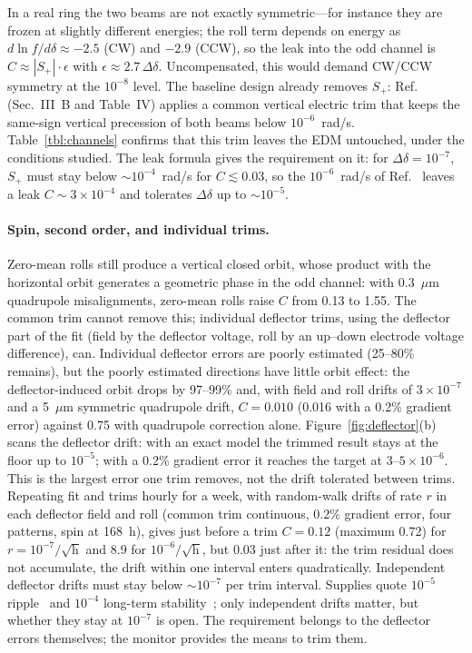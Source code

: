 \documentclass[aps,prab,reprint,superscriptaddress,nofootinbib]{revtex4-2}
\begin{document}
In a real ring the two beams are not exactly symmetric---for instance they are frozen at slightly different
energies; the roll term depends on energy as $d\ln f/d\delta\approx-2.5$ (CW) and $-2.9$ (CCW), so the leak into
the odd channel is $C\approx|S_+|\cdot\epsilon$ with $\epsilon\approx2.7\,\Delta\delta$. Uncompensated, this would
demand CW/CCW symmetry at the $10^{-8}$ level. The baseline design already removes $S_+$: Ref.~\cite{omarov}
(Sec.~III~B and Table~IV) applies a common vertical electric trim that keeps the same-sign vertical precession
of both beams below $10^{-6}$~rad/s. Table~\ref{tbl:channels} confirms that this trim leaves the EDM untouched,
under the conditions studied. The leak formula gives the requirement on it: for $\Delta\delta=10^{-7}$, $S_+$ must
stay below $\sim10^{-4}$~rad/s for $C\lesssim0.03$, so the $10^{-6}$~rad/s of Ref.~\cite{omarov} leaves a leak
$C\sim3\times10^{-4}$ and tolerates $\Delta\delta$ up to $\sim10^{-5}$.

\paragraph*{Spin, second order, and individual trims.} Zero-mean rolls still produce a vertical closed orbit,
whose product with the horizontal orbit generates a geometric phase in the odd channel: with 0.3~$\mu$m quadrupole
misalignments, zero-mean rolls raise $C$ from 0.13 to 1.55. The common trim cannot remove this; individual
deflector trims, using the deflector part of the fit (field by the deflector voltage, roll by an up--down
electrode voltage difference), can. Individual deflector errors are poorly estimated (25--80\% remains), but
the poorly estimated directions have little orbit effect: the deflector-induced orbit drops by 97--99\% and,
with field and roll drifts of $3\times10^{-7}$ and a 5~$\mu$m symmetric quadrupole drift, $C=0.010$ (0.016 with a
0.2\% gradient error) against 0.75 with quadrupole correction alone. \MatchedSentenceEN Figure~\ref{fig:deflector}(b)
scans the deflector drift: with an exact model the trimmed result stays at the floor up to $10^{-5}$; with a
0.2\% gradient error it reaches the target at $3$--$5\times10^{-6}$. This is the largest error one trim
removes, not the drift tolerated between trims. Repeating fit and trims hourly for a week, with random-walk
drifts of rate $r$ in each deflector field and roll (common trim continuous, 0.2\% gradient error, four
patterns, spin at 168~h), gives just before a trim $C=0.12$ (maximum 0.72) for $r=10^{-7}/\sqrt{\text{h}}$ and
8.9 for $10^{-6}/\sqrt{\text{h}}$, but 0.03 just after it: the trim residual does not accumulate, the drift
within one interval enters quadratically. Independent deflector drifts must stay below $\sim10^{-7}$ per trim
interval. Supplies quote $10^{-5}$ ripple~\cite{cpedm_feas} and $10^{-4}$ long-term stability~\cite{fug};
only independent drifts matter, but whether they stay at $10^{-7}$ is open. The requirement belongs to the
deflector errors themselves; the monitor provides the means to trim them.
\end{document}
